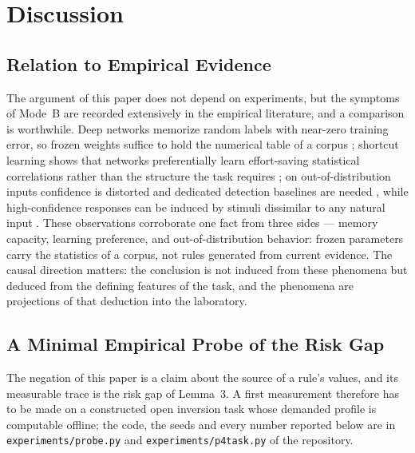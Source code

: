 \section{Discussion}
\label{ch:discussion}

\subsection{Relation to Empirical Evidence}

The argument of this paper does not depend on experiments, but the symptoms of Mode~B are recorded extensively in the empirical literature, and a comparison is worthwhile. Deep networks memorize random labels with near-zero training error, so frozen weights suffice to hold the numerical table of a corpus \citep{zhang2021}; shortcut learning shows that networks preferentially learn effort-saving statistical correlations rather than the structure the task requires \citep{geirhos2020}; on out-of-distribution inputs confidence is distorted and dedicated detection baselines are needed \citep{hendrycks2016,yang2024}, while high-confidence responses can be induced by stimuli dissimilar to any natural input \citep{nguyen2014}. These observations corroborate one fact from three sides --- memory capacity, learning preference, and out-of-distribution behavior: frozen parameters carry the statistics of a corpus, not rules generated from current evidence. The causal direction matters: the conclusion is not induced from these phenomena but deduced from the defining features of the task, and the phenomena are projections of that deduction into the laboratory.

\subsection{A Minimal Empirical Probe of the Risk Gap}
\label{sec:probe}

The negation of this paper is a claim about the source of a rule's values, and its measurable trace is the risk gap of Lemma~3. A first measurement therefore has to be made on a constructed open inversion task whose demanded profile is computable offline; the code, the seeds and every number reported below are in \texttt{experiments/probe.py} and \texttt{experiments/p4\ttu task.py} of the repository.

